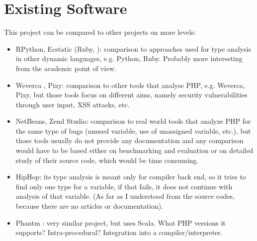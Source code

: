 \chapter{Existing Software}
    This project can be compared to other projects on more levels:
    \begin{itemize}
        \item{RPython, Ecstatic (Ruby, \cite{madsen2007ecstatic}):} comparison to approaches used 
            for type analysis in other dynamic languages, e.g. Python, Ruby. 
            Probably more interesting from the academic point of view.
        \item{Weverca \cite{hauzarhunting}, Pixy\cite{jovanovic2006pixy}:} comparison to other tools that analyse PHP, e.g. Weverca, Pixy, 
            but those tools focus on different aims, namely security vulnerabilities 
            through user input, XSS attacks, etc.
        \item{NetBeans, Zend Studio:} comparison to real world tools that analyze PHP for the same 
            type of bugs (unused variable, use of unassigned variable, etc.), 
            but those tools usually do not provide any documentation and 
            any comparison would have to be based either on benchmarking and 
            evaluation or on detailed study of their source code, which would be 
            time consuming.
        \item{HipHop:} its type analysis is meant only for compiler back end, 
            so it tries to find only one type for a variable, if that fails, 
            it does not continue with analysis of that variable. 
            (As far as I understood from the source codes, because there 
            are no articles or documentation).
        \item{Phantm \cite{kneuss2010using}:} very similar project, but 
            uses Scala. What PHP versions it supports? Intra-procedural? 
            Integration into a compiler/interpreter.
    \end{itemize}    
